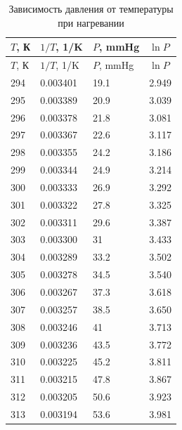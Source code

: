 \documentclass[12pt]{article}
\begin{document}
\begin{longtable}[H]{|l|l|l|l|} 
	
	\caption{Зависимость давления от температуры при нагревании} 
	
	\\ \hline
	$T$, К & $1/T$, 1/K & $P$, mmHg & $\ln{P}$ \\ \hline
	\endfirsthead
	\hline
	$T$, К & $1/T$, 1/K & $P$, mmHg & $\ln{P}$ \\ \hline
	\endhead
	
	294    & 0.003401   & 19.1      & 2.949    \\ \hline
	295    & 0.003389   & 20.9      & 3.039    \\ \hline
	296    & 0.003378   & 21.8      & 3.081    \\ \hline
	297    & 0.003367   & 22.6      & 3.117    \\ \hline
	298    & 0.003355   & 24.2      & 3.186    \\ \hline
	299    & 0.003344   & 24.9      & 3.214    \\ \hline
	300    & 0.003333   & 26.9      & 3.292    \\ \hline
	301    & 0.003322   & 27.8      & 3.325    \\ \hline
	302    & 0.003311   & 29.6      & 3.387    \\ \hline
	303    & 0.003300   & 31        & 3.433    \\ \hline
	304    & 0.003289   & 33.2      & 3.502    \\ \hline
	305    & 0.003278   & 34.5      & 3.540    \\ \hline
	306    & 0.003267   & 37.3      & 3.618    \\ \hline
	307    & 0.003257   & 38.5      & 3.650    \\ \hline
	308    & 0.003246   & 41        & 3.713    \\ \hline
	309    & 0.003236   & 43.5      & 3.772    \\ \hline
	310    & 0.003225   & 45.2      & 3.811    \\ \hline
	311    & 0.003215   & 47.8      & 3.867    \\ \hline
	312    & 0.003205   & 50.6      & 3.923    \\ \hline
	313    & 0.003194   & 53.6      & 3.981    \\ \hline
\end{longtable}
\end{document}
